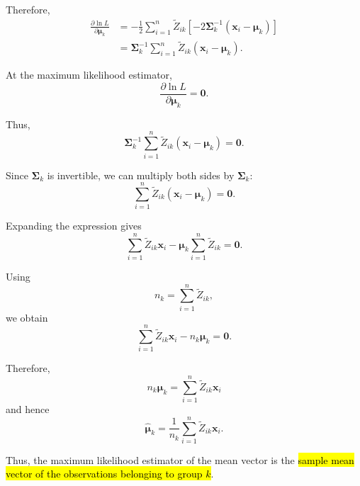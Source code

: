 Therefore,
\begin{align*}
\frac{\partial\ln L}
{\partial\boldsymbol{\mu}_k}
&=
-\frac{1}{2}
\sum_{i=1}^n
\tilde{Z}_{ik}
\left[
-2\boldsymbol{\Sigma}_k^{-1}
(\boldsymbol{x}_i-\boldsymbol{\mu}_k)
\right]\\
&=
\boldsymbol{\Sigma}_k^{-1}
\sum_{i=1}^n
\tilde{Z}_{ik}
(\boldsymbol{x}_i-\boldsymbol{\mu}_k).
\end{align*}

At the maximum likelihood estimator,
\begin{equation*}
\frac{\partial\ln L}
{\partial\boldsymbol{\mu}_k}
=
\boldsymbol{0}.
\end{equation*}

Thus,
\begin{equation*}
\boldsymbol{\Sigma}_k^{-1}
\sum_{i=1}^n
\tilde{Z}_{ik}
(\boldsymbol{x}_i-\boldsymbol{\mu}_k)
=
\boldsymbol{0}.
\end{equation*}

Since $\boldsymbol{\Sigma}_k$ is invertible, we can multiply both
sides by $\boldsymbol{\Sigma}_k$:
\begin{equation*}
\sum_{i=1}^n
\tilde{Z}_{ik}
(\boldsymbol{x}_i-\boldsymbol{\mu}_k)
=
\boldsymbol{0}.
\end{equation*}

Expanding the expression gives
\begin{equation*}
\sum_{i=1}^n
\tilde{Z}_{ik}\boldsymbol{x}_i
-
\boldsymbol{\mu}_k
\sum_{i=1}^n\tilde{Z}_{ik}
=
\boldsymbol{0}.
\end{equation*}

Using
\begin{equation*}
n_k=\sum_{i=1}^n\tilde{Z}_{ik},
\end{equation*}
we obtain
\begin{equation*}
\sum_{i=1}^n
\tilde{Z}_{ik}\boldsymbol{x}_i
-
n_k\boldsymbol{\mu}_k
=
\boldsymbol{0}.
\end{equation*}

Therefore,
\begin{equation*}
n_k\boldsymbol{\mu}_k
=
\sum_{i=1}^n
\tilde{Z}_{ik}\boldsymbol{x}_i
\end{equation*}
and hence
\begin{equation*}
\boxed{
\hat{\boldsymbol{\mu}}_k
=
\frac{1}{n_k}
\sum_{i=1}^n
\tilde{Z}_{ik}\boldsymbol{x}_i
}.
\end{equation*}

Thus, the maximum likelihood estimator of the mean vector is the
\hl{sample mean vector of the observations belonging to group $k$}.


